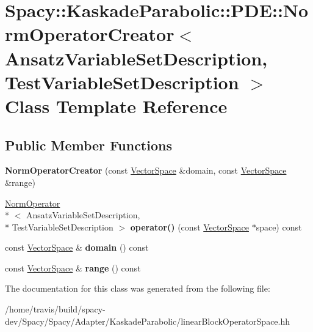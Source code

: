 \hypertarget{classSpacy_1_1KaskadeParabolic_1_1PDE_1_1NormOperatorCreator}{\section{Spacy\-:\-:Kaskade\-Parabolic\-:\-:P\-D\-E\-:\-:Norm\-Operator\-Creator$<$ Ansatz\-Variable\-Set\-Description, Test\-Variable\-Set\-Description $>$ Class Template Reference}
\label{classSpacy_1_1KaskadeParabolic_1_1PDE_1_1NormOperatorCreator}
}
\subsection*{Public Member Functions}
\begin{DoxyCompactItemize}
\item 
\hypertarget{classSpacy_1_1KaskadeParabolic_1_1PDE_1_1NormOperatorCreator_ace55ef1445e25408c235bab00c9f3720}{{\bfseries Norm\-Operator\-Creator} (const \hyperlink{classSpacy_1_1VectorSpace}{Vector\-Space} \&domain, const \hyperlink{classSpacy_1_1VectorSpace}{Vector\-Space} \&range)}\label{classSpacy_1_1KaskadeParabolic_1_1PDE_1_1NormOperatorCreator_ace55ef1445e25408c235bab00c9f3720}

\item 
\hypertarget{classSpacy_1_1KaskadeParabolic_1_1PDE_1_1NormOperatorCreator_adf26557e678d9b56d7e6b42fd9302b6d}{\hyperlink{classSpacy_1_1KaskadeParabolic_1_1PDE_1_1NormOperator}{Norm\-Operator}\\*
$<$ Ansatz\-Variable\-Set\-Description, \\*
Test\-Variable\-Set\-Description $>$ {\bfseries operator()} (const \hyperlink{classSpacy_1_1VectorSpace}{Vector\-Space} $\ast$space) const }\label{classSpacy_1_1KaskadeParabolic_1_1PDE_1_1NormOperatorCreator_adf26557e678d9b56d7e6b42fd9302b6d}

\item 
\hypertarget{classSpacy_1_1KaskadeParabolic_1_1PDE_1_1NormOperatorCreator_aa5f42fbcacc45dbbdf3db10777a3dd5c}{const \hyperlink{classSpacy_1_1VectorSpace}{Vector\-Space} \& {\bfseries domain} () const }\label{classSpacy_1_1KaskadeParabolic_1_1PDE_1_1NormOperatorCreator_aa5f42fbcacc45dbbdf3db10777a3dd5c}

\item 
\hypertarget{classSpacy_1_1KaskadeParabolic_1_1PDE_1_1NormOperatorCreator_a8ccd05a693ca33a1a89ca0339e240710}{const \hyperlink{classSpacy_1_1VectorSpace}{Vector\-Space} \& {\bfseries range} () const }\label{classSpacy_1_1KaskadeParabolic_1_1PDE_1_1NormOperatorCreator_a8ccd05a693ca33a1a89ca0339e240710}

\end{DoxyCompactItemize}


The documentation for this class was generated from the following file\-:\begin{DoxyCompactItemize}
\item 
/home/travis/build/spacy-\/dev/\-Spacy/\-Spacy/\-Adapter/\-Kaskade\-Parabolic/linear\-Block\-Operator\-Space.\-hh\end{DoxyCompactItemize}
